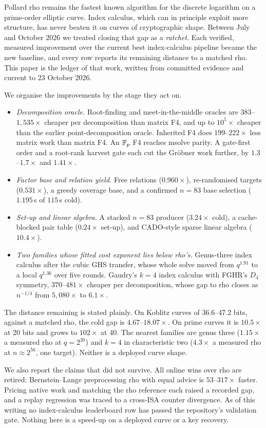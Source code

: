 Pollard rho remains the fastest known algorithm for the discrete logarithm on
a prime-order elliptic curve. Index calculus, which can in principle exploit
more structure, has never beaten it on curves of cryptographic shape. Between
July and October 2026 we treated closing that gap as a \emph{ratchet}. Each
verified, measured improvement over the current best index-calculus pipeline
became the new baseline, and every row reports its remaining distance to a
matched rho. This paper is the ledger of that work, written from committed
evidence and current to 23 October 2026.

We organise the improvements by the stage they act on.
\begin{itemize}
\item \emph{Decomposition oracle.} Root-finding and meet-in-the-middle
  oracles are $383$--$1{,}535\times$ cheaper per decomposition than matrix
  F4, and up to $10^5\times$ cheaper than the earlier point-decomposition
  oracle. Inherited F4 does $199$--$222\times$ less matrix work than matrix
  F4. An $\mathbb{F}_p$ F4 reaches msolve parity. A gate-first order and a
  root-rank harvest gate each cut the Gr\"obner work further, by
  $1.3$--$1.7\times$ and $1.41\times$.
\item \emph{Factor base and relation yield.} Free relations ($0.960\times$),
  re-randomised targets ($0.531\times$), a greedy coverage base, and a
  confirmed $n=83$ base selection ($1.195$\,s of $115$\,s cold).
\item \emph{Set-up and linear algebra.} A stacked $n=83$ producer
  ($3.24\times$ cold), a cache-blocked pair table ($0.24\times$ set-up), and
  CADO-style sparse linear algebra ($10.4\times$).
\item \emph{Two families whose fitted cost exponent lies below rho's.}
  Genus-three index calculus after the cubic GHS transfer, whose whole solve
  moved from $q^{1.91}$ to a local $q^{1.36}$ over five rounds. Gaudry's
  $k=4$ index calculus with FGHR's $D_4$ symmetry, $370$--$481\times$
  cheaper per decomposition, whose gap to rho closes as $n^{-1/4}$ from
  $5{,}080\times$ to $6.1\times$.
\end{itemize}

The distance remaining is stated plainly. On Koblitz curves of 36.6--47.2
bits, against a matched rho, the cold gap is $4.67$--$18.07\times$. On prime
curves it is $10.5\times$ at 20 bits and grows to $102\times$ at 40. The
nearest families are genus three ($1.15\times$ a measured rho at $q=2^{20}$)
and $k=4$ in characteristic two ($4.3\times$ a measured rho at $n\approx2^{56}$,
one target). Neither is a deployed curve shape.

We also report the claims that did not survive. All online wins over rho are
retired: Bernstein--Lange preprocessing rho with equal advice is
$53$--$317\times$ faster. Pricing native work and matching the rho reference
each raised a recorded gap, and a replay regression was traced to a
cross-ISA counter divergence. As of
this writing no index-calculus leaderboard row has passed the repository's
validation gate. Nothing here is a speed-up on a deployed curve or a key
recovery.
